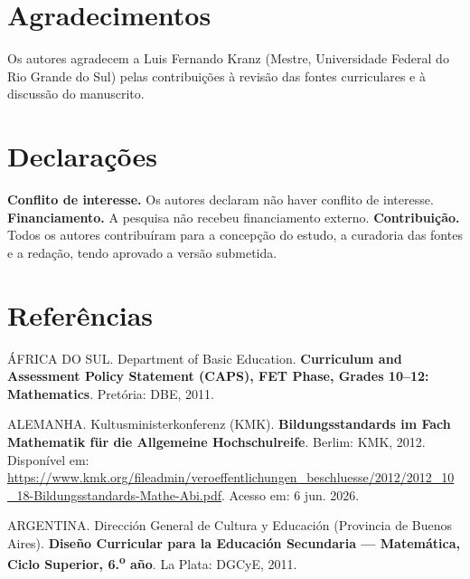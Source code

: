 \documentclass[12pt,a4paper,oneside]{article}
\begin{document}
\section*{Agradecimentos}
Os autores agradecem a Luis Fernando Kranz (Mestre, Universidade Federal
do Rio Grande do Sul) pelas contribuições à revisão das fontes curriculares
e à discussão do manuscrito.

\section*{Declarações}
\noindent\textbf{Conflito de interesse.} Os autores declaram não haver
conflito de interesse. \textbf{Financiamento.} A pesquisa não recebeu
financiamento externo. \textbf{Contribuição.} Todos os autores
contribuíram para a concepção do estudo, a curadoria das fontes e a
redação, tendo aprovado a versão submetida.

\newpage
\section*{Referências}

\begingroup
{}
\setlength{\parindent}{0pt}
\raggedright
\newcommand{\refitem}[1]{\par #1\par\vspace{12pt}}

\refitem{ÁFRICA DO SUL. Department of Basic Education. \textbf{Curriculum
and Assessment Policy Statement (CAPS), FET Phase, Grades 10--12:
Mathematics}. Pretória: DBE, 2011.}

\refitem{ALEMANHA. Kultusministerkonferenz (KMK). \textbf{Bildungsstandards
im Fach Mathematik für die Allgemeine Hochschulreife}. Berlim: KMK, 2012.
Disponível em:
\url{https://www.kmk.org/fileadmin/veroeffentlichungen_beschluesse/2012/2012_10_18-Bildungsstandards-Mathe-Abi.pdf}.
Acesso em: 6 jun. 2026.}

\refitem{ARGENTINA. Dirección General de Cultura y Educación (Provincia
de Buenos Aires). \textbf{Diseño Curricular para la Educación Secundaria
--- Matemática, Ciclo Superior, 6.\textsuperscript{o} año}. La Plata:
DGCyE, 2011.}
\end{document}
